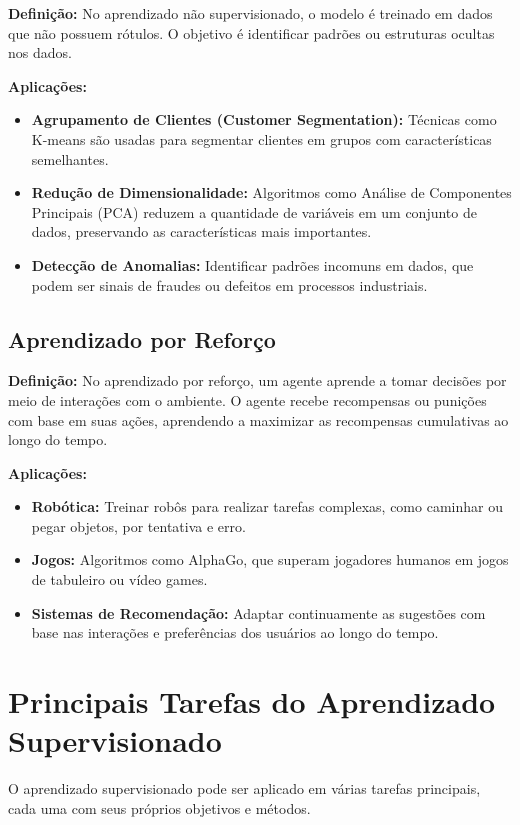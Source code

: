 \documentclass{article}
\begin{document}
\textbf{Definição:} No aprendizado não supervisionado, o modelo é treinado em dados que não possuem rótulos. O objetivo é identificar padrões ou estruturas ocultas nos dados.

\textbf{Aplicações:}
\begin{itemize}
    \item \textbf{Agrupamento de Clientes (Customer Segmentation):} Técnicas como K-means são usadas para segmentar clientes em grupos com características semelhantes.
    \item \textbf{Redução de Dimensionalidade:} Algoritmos como Análise de Componentes Principais (PCA) reduzem a quantidade de variáveis em um conjunto de dados, preservando as características mais importantes.
    \item \textbf{Detecção de Anomalias:} Identificar padrões incomuns em dados, que podem ser sinais de fraudes ou defeitos em processos industriais.
\end{itemize}

\subsection{Aprendizado por Reforço}

\textbf{Definição:} No aprendizado por reforço, um agente aprende a tomar decisões por meio de interações com o ambiente. O agente recebe recompensas ou punições com base em suas ações, aprendendo a maximizar as recompensas cumulativas ao longo do tempo.

\textbf{Aplicações:}
\begin{itemize}
    \item \textbf{Robótica:} Treinar robôs para realizar tarefas complexas, como caminhar ou pegar objetos, por tentativa e erro.
    \item \textbf{Jogos:} Algoritmos como AlphaGo, que superam jogadores humanos em jogos de tabuleiro ou vídeo games.
    \item \textbf{Sistemas de Recomendação:} Adaptar continuamente as sugestões com base nas interações e preferências dos usuários ao longo do tempo.
\end{itemize}

\section{Principais Tarefas do Aprendizado Supervisionado}

O aprendizado supervisionado pode ser aplicado em várias tarefas principais, cada uma com seus próprios objetivos e métodos.
\end{document}
